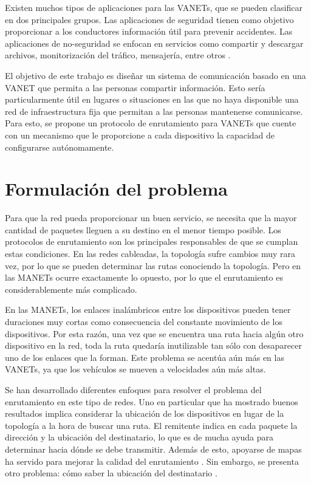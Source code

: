 Existen muchos tipos de aplicaciones para las VANETs, que se pueden clasificar
en dos principales grupos. Las aplicaciones de seguridad tienen como objetivo
proporcionar a los conductores información útil para prevenir accidentes. Las
aplicaciones de no-seguridad se enfocan en servicios como compartir y descargar
archivos, monitorización del tráfico, mensajería, entre otros
\cite{Meneguette2018}.

El objetivo de este trabajo es diseñar un sistema de comunicación basado en una
VANET que permita a las personas compartir información. Esto sería
particularmente útil en lugares o situaciones en las que no haya disponible una
red de infraestructura fija que permitan a las personas mantenerse comunicarse.
Para esto, se propone un protocolo de enrutamiento para VANETs que cuente con
un mecanismo que le proporcione a cada dispositivo la capacidad de configurarse
autónomamente.

\section{Formulación del problema}

\label{sec:formulacion_del_problema}

Para que la red pueda proporcionar un buen servicio, se necesita que la mayor
cantidad de paquetes lleguen a su destino en el menor tiempo posible. Los
protocolos de enrutamiento son los principales responsables de que se cumplan
estas condiciones. En las redes cableadas, la topología sufre cambios muy rara
vez, por lo que se pueden determinar las rutas conociendo la topología.
Pero en las MANETs ocurre exactamente lo opuesto, por lo que el enrutamiento es
considerablemente más complicado.

En las MANETs, los enlaces inalámbricos entre los dispositivos pueden tener
duraciones muy cortas como consecuencia del constante movimiento de los
dispositivos. Por esta razón, una vez que se encuentra una ruta hacia algún otro
dispositivo en la red, toda la ruta quedaría inutilizable tan sólo con
desaparecer uno de los enlaces que la forman. Este problema se acentúa aún más
en las VANETs, ya que los vehículos se mueven a velocidades aún más altas.

Se han desarrollado diferentes enfoques para resolver el problema del
enrutamiento en este tipo de redes. Uno en particular que ha mostrado buenos
resultados implica considerar la ubicación de los dispositivos en lugar de la
topología a la hora de buscar una ruta. El remitente indica en cada paquete la
dirección y la ubicación del destinatario, lo que es de mucha ayuda para
determinar hacia dónde se debe transmitir. Además de esto, apoyarse de mapas ha
servido para mejorar la calidad del enrutamiento \cite{Lochert2003}. Sin
embargo, se presenta otro problema: cómo saber la ubicación del destinatario
\cite{Brendha2017}.

